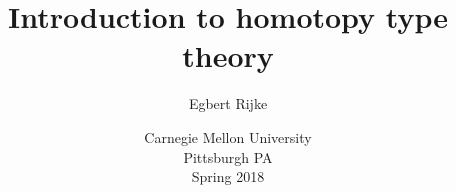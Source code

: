 \documentclass[11pt]{memoir} %
\title{Introduction to homotopy type theory}
\author{Egbert Rijke}
\date{Carnegie Mellon University\\Pittsburgh PA\\Spring 2018}%
\begin{document}
\frontmatter

\begin{titlingpage}
\maketitle 
\end{titlingpage}

\tableofcontents

%



\mainmatter 

































%

%

%

%

%

%

%

\backmatter

\printbibliography

\printindex
\end{document}
